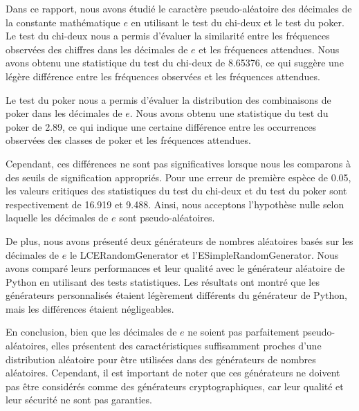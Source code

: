 \documentclass{article}
\begin{document}
Dans ce rapport, nous avons étudié le caractère pseudo-aléatoire des décimales de la constante mathématique \(e\) en utilisant le test du chi-deux et le test du poker. Le test du chi-deux nous a permis d'évaluer la similarité entre les fréquences observées des chiffres dans les décimales de \(e\) et les fréquences attendues. Nous avons obtenu une statistique du test du chi-deux de 8.65376, ce qui suggère une légère différence entre les fréquences observées et les fréquences attendues.

Le test du poker nous a permis d'évaluer la distribution des combinaisons de poker dans les décimales de \(e\). Nous avons obtenu une statistique du test du poker de 2.89, ce qui indique une certaine différence entre les occurrences observées des classes de poker et les fréquences attendues.

Cependant, ces différences ne sont pas significatives lorsque nous les comparons à des seuils de signification appropriés. Pour une erreur de première espèce de 0.05, les valeurs critiques des statistiques du test du chi-deux et du test du poker sont respectivement de 16.919 et 9.488. Ainsi, nous acceptons l'hypothèse nulle selon laquelle les décimales de \(e\) sont pseudo-aléatoires.

De plus, nous avons présenté deux générateurs de nombres aléatoires basés sur les décimales de \(e\) le LCERandomGenerator et l'ESimpleRandomGenerator. 
Nous avons comparé leurs performances et leur qualité avec le générateur aléatoire de Python en utilisant des tests statistiques. Les résultats ont montré que les générateurs personnalisés étaient légèrement différents du générateur de Python, mais les différences étaient négligeables.

En conclusion, bien que les décimales de \(e\) ne soient pas parfaitement pseudo-aléatoires, elles présentent des caractéristiques suffisamment proches d'une distribution aléatoire pour être utilisées dans des générateurs de nombres aléatoires. Cependant, il est important de noter que ces générateurs ne doivent pas être considérés comme des générateurs cryptographiques, car leur qualité et leur sécurité ne sont pas garanties.
\end{document}
